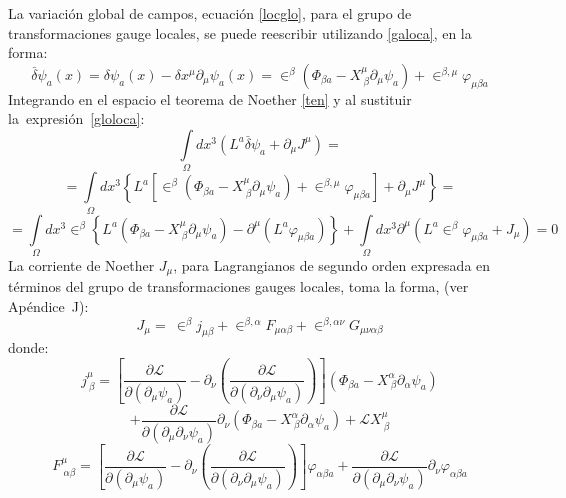 \documentclass[a4paper,12pt]{article}
\begin{document}
La variación global de campos, ecuación \eqref{locglo}, para el grupo de transformaciones gauge locales, se puede reescribir utilizando \eqref{galoca}, en la forma:
\begin{equation}
\overset{\_}{\delta}\psi_a(x)= \delta\psi_a(x)-\delta x^{\mu}\partial_\mu\psi_a(x)= \in^\beta(\Phi_{\beta a}-X_{\ \beta}^\mu\partial_\mu\psi_a)+\in^{\beta,\mu}\varphi_{\mu\beta a}
\label{gloloca} 
\end{equation}
Integrando en el espacio el teorema de Noether \eqref{ten} y al sustituir \mbox{la expresión \eqref{gloloca}:}
\begin{equation}
\int\limits_{\Omega}dx^{3}(L^a\overset{\_}{\delta}\psi_a+\partial_\mu J^\mu)\label{noloc}=
\end{equation}
$$=\int\limits_{\Omega}dx^{3}\left\{ L^a\left[\in^\beta(\Phi_{\beta a}-X_{\ \beta}^\mu\partial_\mu\psi_a)+\in^{\beta,\mu}\varphi_{\mu\beta a}\right]+\partial_\mu J^\mu\right\}=
$$
$$
=\int\limits_{\Omega}dx^{3}\in^\beta\left\{L^a(\Phi_{\beta a}-X_{\ \beta}^\mu\partial_\mu\psi_a)-\partial^\mu(L^a\varphi_{\mu\beta a})\right\}+\int\limits_{\Omega}dx^{3}\partial^\mu(L^a\in^{\beta}\varphi_{\mu\beta a}+J_\mu)=0 
$$
La corriente de Noether $J_\mu$, para Lagrangianos de segundo orden expresada en términos del grupo de transformaciones gauges locales, toma la forma, (ver \mbox{Apéndice J):} 
\begin{equation}
J_\mu=\ \in^\beta j_{\mu\beta}+\in^{\beta,\alpha}F_{\mu\alpha\beta}+\in^{\beta,\alpha\nu}G_{\mu\nu\alpha\beta}
\label{conlocss}
\end{equation}
donde:
\begin{equation}
j^\mu_{\ \beta}=\left[\frac{\partial \mathscr{L} }{\partial(\partial_{\mu} \psi_a)}-\partial_{\nu}\left(\frac{\partial\mathscr{L} }{\partial(\partial_{\nu}\partial_{\mu} \psi_a)}  \right) \right](\Phi_{\beta a}-X_{\ \beta}^\alpha\partial_\alpha\psi_a)
\end{equation}
$$+\frac{\partial\mathscr{L} }{\partial(\partial_{\mu}\partial_{\nu} \psi_a)}\partial_{\nu}(\Phi_{\beta a}-X_{\ \beta}^\alpha\partial_\alpha\psi_a)+\mathscr{L}X_{\ \beta}^\mu$$
\begin{equation}
F^\mu_{\ \alpha\beta}=\left[\frac{\partial \mathscr{L} }{\partial(\partial_{\mu} \psi_a)}-\partial_{\nu}\left(\frac{\partial\mathscr{L} }{\partial(\partial_{\nu}\partial_{\mu} \psi_a)}  \right) \right]\varphi_{\alpha\beta a}+\frac{\partial\mathscr{L} }{\partial(\partial_{\mu}\partial_{\nu} \psi_a)}\partial_{\nu}\varphi_{\alpha\beta a}
\end{equation}
\end{document}
